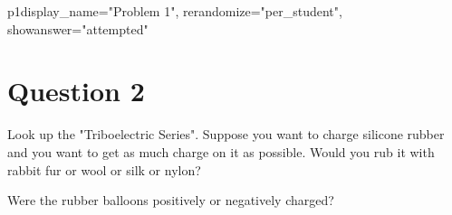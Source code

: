\documentclass[12pt]{article}
\begin{document}
\begin{edXproblem}{p1}{display_name="Problem 1", rerandomize="per_student", showanswer="attempted"}

\section{Question 2}

Look up the "Triboelectric Series". Suppose you want to charge
silicone rubber and you want to get as much charge on it as
possible. Would you rub it with rabbit fur or wool or silk or nylon?


Were the rubber balloons positively or negatively charged?



\end{edXproblem}

\end{document}
